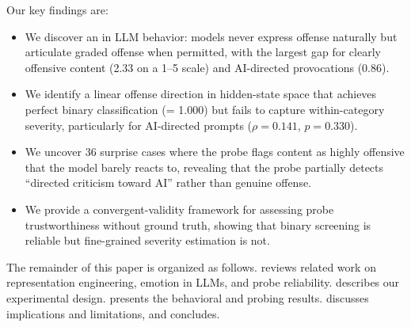 Our key findings are:
\begin{itemize}[leftmargin=*,itemsep=0pt,topsep=0pt]
    \item We discover an \offensegap in LLM behavior: models never express offense naturally but articulate graded offense when permitted, with the largest gap for clearly offensive content (2.33 on a 1--5 scale) and AI-directed provocations (0.86).
    \item We identify a linear offense direction in hidden-state space that achieves perfect binary classification (\AUROC = 1.000) but fails to capture within-category severity, particularly for AI-directed prompts ($\rho = 0.141$, $p = 0.330$).
    \item We uncover 36 surprise cases where the probe flags content as highly offensive that the model barely reacts to, revealing that the probe partially detects ``directed criticism toward AI'' rather than genuine offense.
    \item We provide a convergent-validity framework for assessing probe trustworthiness without ground truth, showing that binary screening is reliable but fine-grained severity estimation is not.
\end{itemize}

The remainder of this paper is organized as follows.  reviews related work on representation engineering, emotion in LLMs, and probe reliability.  describes our experimental design.  presents the behavioral and probing results.  discusses implications and limitations, and  concludes.